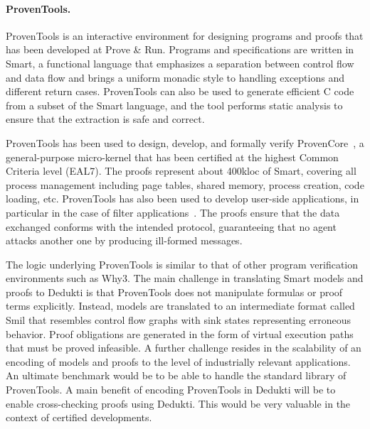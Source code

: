 \paragraph*{ProvenTools.}
ProvenTools is an interactive environment for designing programs and proofs that
has been developed at Prove \& Run. Programs and
specifications are written in Smart, a functional language that
emphasizes a separation between control flow and data flow and brings a uniform
monadic style to handling exceptions and different return cases.
ProvenTools can also be used to generate efficient C code from a subset
of the Smart language, and the tool performs static analysis to ensure
that the extraction is safe and correct.

ProvenTools has been used to design, develop, and formally verify
ProvenCore~\cite{lescuyer:provencore}, a general-purpose micro-kernel that has
been certified at the highest Common Criteria level (EAL7). The proofs represent
about 400kloc of Smart, covering all process management including page
tables, shared memory, process creation, code loading, etc. ProvenTools has also
been used to develop user-side applications, in particular in the case of filter
applications~\cite{bolignano:security}. The proofs ensure that the data
exchanged conforms with the intended protocol, guaranteeing that no agent
attacks another one by producing ill-formed messages.

The logic underlying ProvenTools is similar to that of other program
verification environments such as Why3. The main challenge in translating
Smart models and proofs to Dedukti is that ProvenTools does not
manipulate formulas or proof terms explicitly. Instead, models are translated to
an intermediate format called Smil that resembles control flow graphs
with sink states representing erroneous behavior. Proof obligations are
generated in the form of virtual execution paths that must be proved infeasible.
A further challenge resides in the scalability of an encoding of models and
proofs to the level of industrially relevant applications. An ultimate benchmark
would be to be able to handle the standard library of ProvenTools. A main
benefit of encoding ProvenTools in Dedukti will be to enable cross-checking
proofs using Dedukti. This would be very valuable in the context of certified
developments.

